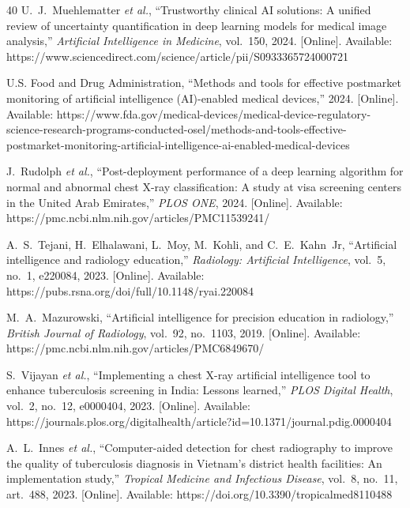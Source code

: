 \documentclass[conference, letterpaper]{IEEEtran}
\begin{document}
\begin{thebibliography}{40}
U.~J.~Muehlematter \textit{et al.}, ``Trustworthy clinical AI solutions: A unified review of uncertainty quantification in deep learning models for medical image analysis,'' \textit{Artificial Intelligence in Medicine}, vol.~150, 2024. [Online]. Available: https://www.sciencedirect.com/science/article/pii/S0933365724000721

U.S. Food and Drug Administration, ``Methods and tools for effective postmarket monitoring of artificial intelligence (AI)-enabled medical devices,'' 2024. [Online]. Available: https://www.fda.gov/medical-devices/medical-device-regulatory-science-research-programs-conducted-osel/methods-and-tools-effective-postmarket-monitoring-artificial-intelligence-ai-enabled-medical-devices

J.~Rudolph \textit{et al.}, ``Post-deployment performance of a deep learning algorithm for normal and abnormal chest X-ray classification: A study at visa screening centers in the United Arab Emirates,'' \textit{PLOS ONE}, 2024. [Online]. Available: https://pmc.ncbi.nlm.nih.gov/articles/PMC11539241/

A.~S.~Tejani, H.~Elhalawani, L.~Moy, M.~Kohli, and C.~E.~Kahn~Jr, ``Artificial intelligence and radiology education,'' \textit{Radiology: Artificial Intelligence}, vol.~5, no.~1, e220084, 2023. [Online]. Available: https://pubs.rsna.org/doi/full/10.1148/ryai.220084

M.~A.~Mazurowski, ``Artificial intelligence for precision education in radiology,'' \textit{British Journal of Radiology}, vol.~92, no.~1103, 2019. [Online]. Available: https://pmc.ncbi.nlm.nih.gov/articles/PMC6849670/

S.~Vijayan \textit{et al.}, ``Implementing a chest X-ray artificial intelligence tool to enhance tuberculosis screening in India: Lessons learned,'' \textit{PLOS Digital Health}, vol.~2, no.~12, e0000404, 2023. [Online]. Available: https://journals.plos.org/digitalhealth/article?id=10.1371/journal.pdig.0000404

A.~L.~Innes \textit{et al.}, ``Computer-aided detection for chest radiography to improve the quality of tuberculosis diagnosis in Vietnam's district health facilities: An implementation study,'' \textit{Tropical Medicine and Infectious Disease}, vol.~8, no.~11, art.~488, 2023. [Online]. Available: https://doi.org/10.3390/tropicalmed8110488


\end{thebibliography}
\end{document}
